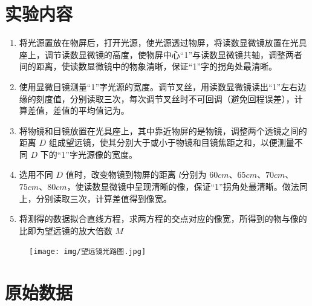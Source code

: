 \documentclass[UTF8]{ctexart}
\title{}
\author{}
\date{}
\begin{document}
\begin{titlepage}		
		
\end{titlepage}

\section{实验内容}
\begin{enumerate}
    \item 将光源置放在物屏后，打开光源，使光源透过物屏，将读数显微镜放置在光具座上，调节读数显微镜的高度，使物屏中心“1”与读数显微镜共轴，调整两者间的距离，使读数显微镜中的物象清晰，保证“1”字的拐角处最清晰。
    \item 使用显微目镜测量“1”字光源的宽度。调节叉丝，用读数显微镜读出“1”左右边缘的刻度值，分别读取三次，每次调节叉丝时不可回调（避免回程误差），计算差值，差值的平均值记为。
    \item 将物镜和目镜放置在光具座上，其中靠近物屏的是物镜，调整两个透镜之间的距离 $D$ 组成望远镜，使其分别大于或小于物镜和目镜焦距之和，以便测量不同 $D$ 下的“1”字光源像的宽度。
    \item 选用不同 $D$ 值时，改变物镜到物屏的距离 $l$分别为 $60cm$、$65cm$、$70cm$、$75cm$、$80cm$，使读数显微镜中呈现清晰的像，保证“1”拐角处最清晰。做法同上，分别读取三次，计算差值得到像宽。
    \item 将测得的数据拟合直线方程，求两方程的交点对应的像宽，所得到的物与像的比即为望远镜的放大倍数 $M$
\end{enumerate}

\begin{figure}[H]  %
		\centering
		\texttt{[image: img/望远镜光路图.jpg]}
		\label{fig:side:b} 
\end{figure}


\section{原始数据}
\end{document}
